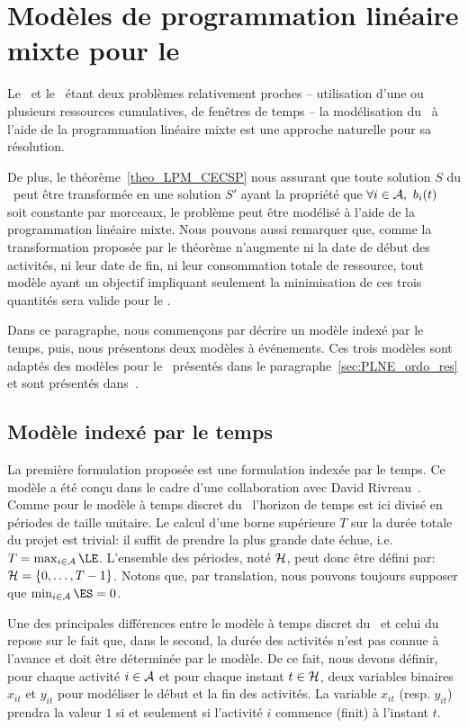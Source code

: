 \section{Modèles de programmation linéaire mixte pour le
\CECSP}
\label{sec:modele_CECSP}
Le \CECSP ~et le \RCPSP~étant deux problèmes relativement proches --
utilisation d'une ou plusieurs ressources cumulatives, de fenêtres de
temps -- la modélisation du \CECSP~à l'aide de la programmation
linéaire mixte est une approche naturelle pour
sa résolution. 

De plus, le théorème~\ref{theo_LPM_CECSP} nous assurant que toute solution
$S$ du \CECSP~peut être transformée en une solution $S'$ ayant la
propriété que $\forall i \in \A,\ b_i(t)$ soit constante par morceaux,
le problème peut être modélisé à l'aide de la programmation linéaire
mixte. Nous pouvons aussi remarquer que, comme la transformation
proposée par le théorème n'augmente ni la date de début des activités,
ni leur date de fin, ni leur consommation totale de ressource, tout modèle
ayant un objectif impliquant seulement la minimisation de ces trois
quantités sera valide pour le \CECSP.

Dans ce paragraphe, nous commençons par décrire un modèle indexé par
le temps, puis, nous présentons deux modèles à événements. Ces trois
modèles sont adaptés des modèles pour le \RCPSP~présentés dans le
paragraphe~\ref{sec:PLNE_ordo_res} et sont présentés
dans~\cite{Nattaf_ORSpectrum}.   


\subsection{Modèle indexé par le temps}

La première formulation proposée est une formulation indexée par le
temps. Ce modèle a été conçu dans le cadre d'une collaboration avec
David Rivreau~\cite{Nattaf_ORSpectrum}. Comme pour le modèle à temps discret du \RCPSP~l'horizon de
temps est ici divisé en périodes de taille unitaire. Le calcul d'une
borne supérieure $T$ sur la durée totale du projet est trivial: il
suffit de prendre la plus grande date échue, i.e. $T=\max_{i \in \A}
\LE$. L'ensemble des périodes, noté ${\cal H}$, peut donc être défini par:
${\cal H}=\{0,\dots,T-1\}$.  Notons que, par translation, nous pouvons
toujours supposer que $\min_{i\in \A} \ES=0$.

Une des principales différences entre le modèle à temps discret du
\RCPSP~et celui du \CECSP~ repose sur le fait que, dans le
second, la durée des activités n'est pas connue à l'avance et doit
être déterminée par le modèle. De ce fait, nous devons définir,
pour chaque activité $i \in {\cal A}$ et pour chaque instant $t
\in {\cal H}$, deux variables binaires $x_{it}$ et $y_{it}$ pour
modéliser le début et la fin des activités. La variable $x_{it}$
(resp. $y_{it}$) prendra la valeur $1$ si et seulement si
l'activité $i$ commence (finit) à l'instant $t$.

